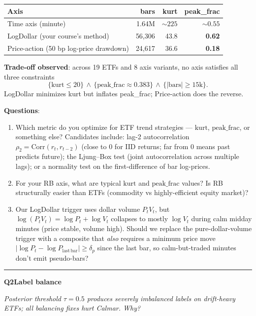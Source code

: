 \documentclass[11pt]{article}
\newcommand{\qhead}[2]{%
  \par\vspace{6pt}%
  \noindent\rule{\linewidth}{0.5pt}\par\vspace{2pt}%
  \noindent\textbf{\Large #1}\par\vspace{3pt}%
  \noindent\textit{#2}\par\vspace{6pt}}
\begin{document}
\smallskip
\begin{tabular}{@{}lrrr@{}}
\toprule
\textbf{Axis} & \textbf{bars} & \textbf{kurt} & \textbf{peak\_frac} \\
\midrule
Time axis (minute) & 1.64M & $\sim 225$ & $\sim 0.55$ \\
LogDollar (your course's method) & 56,306 & 43.8 & \textbf{0.62} \\
Price-action (50 bp log-price drawdown) & 24,617 & 36.6 & \textbf{0.18} \\
\bottomrule
\end{tabular}

\smallskip
\textbf{Trade-off observed}: across 19 ETFs and 8 axis variants, no axis satisfies all three constraints
\[ \{\mathrm{kurt} \le 20\} \,\wedge\, \{\mathrm{peak\_frac} \approx 0.383\} \,\wedge\, \{|\mathrm{bars}| \ge 15\mathrm{k}\}. \]
LogDollar minimizes kurt but inflates peak\_frac; Price-action does the reverse.

\textbf{Questions}:

\begin{enumerate}
\item Which metric do you optimize for ETF trend strategies --- $\mathrm{kurt}$, $\mathrm{peak\_frac}$, or something else? Candidates include: lag-2 autocorrelation $\rho_2 = \mathrm{Corr}(r_t, r_{t-2})$ (close to $0$ for IID returns; far from $0$ means past predicts future); the Ljung--Box test (joint autocorrelation across multiple lags); or a normality test on the first-difference of bar log-prices.

\item For your RB axis, what are typical $\mathrm{kurt}$ and $\mathrm{peak\_frac}$ values? Is RB structurally easier than ETFs (commodity vs highly-efficient equity market)?

\item Our LogDollar trigger uses dollar volume $P_t V_t$, but $\log(P_t V_t) = \log P_t + \log V_t$ collapses to mostly $\log V_t$ during calm midday minutes (price stable, volume high). Should we replace the pure-dollar-volume trigger with a composite that \emph{also} requires a minimum price move $|\log P_t - \log P_{\mathrm{last\,bar}}| \ge \delta_p$ since the last bar, so calm-but-traded minutes don't emit pseudo-bars?
\end{enumerate}

\newpage

\qhead{Q2\enspace Label balance}{Posterior threshold $\tau = 0.5$ produces severely imbalanced labels on drift-heavy ETFs; \emph{all} balancing fixes hurt Calmar. Why?}
\end{document}
